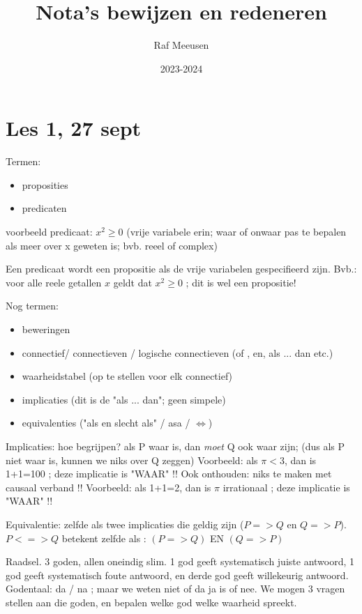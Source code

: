 \documentclass{article}
\title{Nota's bewijzen en redeneren}
\author{Raf Meeusen}
\date{2023-2024}
\begin{document}
\maketitle

\section{Les 1, 27 sept}

Termen: \begin{itemize}
    \item proposities
    \item predicaten
\end{itemize}


voorbeeld predicaat: $x^2 \geq 0 $
(vrije variabele erin; waar of onwaar pas te bepalen als meer over x geweten is; bvb. reeel of complex) 

Een predicaat wordt een propositie als de vrije variabelen gespecifieerd zijn. 
Bvb.: voor alle reele getallen $x$ geldt dat $x^2 \geq 0$  ; dit is wel een propositie! 

Nog termen: 
\begin{itemize}
    \item beweringen
    \item connectief/ connectieven / logische connectieven (of , en, als ... dan etc.) 
    \item waarheidstabel (op te stellen voor elk connectief) 
\item implicaties (dit is de "als ... dan"; geen simpele) 
\item equivalenties ("als en slecht als" / asa / $\Leftrightarrow$) 

\end{itemize}


Implicaties: 
hoe begrijpen? als P waar is, dan \emph{moet} Q ook waar zijn; (dus als P niet waar is, kunnen we niks over Q zeggen) 
Voorbeeld: als $\pi < 3$, dan is 1+1=100 ; deze implicatie is "WAAR" !! 
Ook onthouden: niks te maken met causaal verband !! 
Voorbeeld: als 1+1=2, dan is $\pi$ irrationaal ; deze implicatie is "WAAR" !! 

Equivalentie: zelfde als twee implicaties die geldig zijn ($P=>Q$ en $Q=>P$). 
$P <=> Q $ betekent zelfde als : $(P=>Q)$  EN  $(Q=>P) $

Raadsel. 3 goden, allen oneindig slim. 1 god geeft systematisch juiste antwoord, 1 god geeft systematisch foute antwoord, en derde god geeft willekeurig antwoord. 
Godentaal: da / na ; maar we weten niet of da ja is of nee. 
We mogen 3 vragen stellen aan die goden, en bepalen welke god welke waarheid spreekt. 
\end{document}
